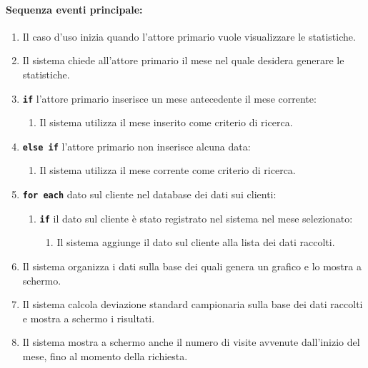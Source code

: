 \documentclass{article}
\begin{document}
	\paragraph{Sequenza eventi principale:}
	\begin{enumerate}[itemsep=8pt,parsep=0pt]
	    \item Il caso d'uso inizia quando l'attore primario vuole visualizzare le statistiche. 
		\item Il sistema chiede all'attore primario il mese nel quale desidera generare le statistiche.
		\item \texttt{\textbf{if}} l'attore primario inserisce un mese antecedente il mese corrente:
			\begin{enumerate}	[leftmargin=28pt]
				\item Il sistema utilizza il mese inserito come criterio di ricerca.
  			\end{enumerate}	
		\item \texttt{\textbf{else if}} l'attore primario non inserisce alcuna data:
			\begin{enumerate}	[leftmargin=28pt]
				\item Il sistema utilizza il mese corrente come criterio di ricerca.
  			\end{enumerate}

		\item \texttt{\textbf{for each}} dato sul cliente nel database dei dati sui clienti:
		    \begin{enumerate}	[leftmargin=28pt]
				\item \texttt{\textbf{if}} il dato sul cliente è stato registrato nel sistema nel mese selezionato:
					\begin{enumerate}	[leftmargin=28pt]
						\item Il sistema aggiunge il dato sul cliente alla lista dei dati raccolti.
		  			\end{enumerate}	
  		    \end{enumerate}

	    \item Il sistema organizza i dati sulla base dei quali genera un grafico e lo mostra a schermo.
	    \item Il sistema calcola deviazione standard campionaria sulla base dei dati raccolti e mostra a schermo i risultati.
	    \item Il sistema mostra a schermo anche il numero di visite avvenute dall'inizio del mese, fino al momento della richiesta. %
	\end{enumerate}
	
\end{document}
